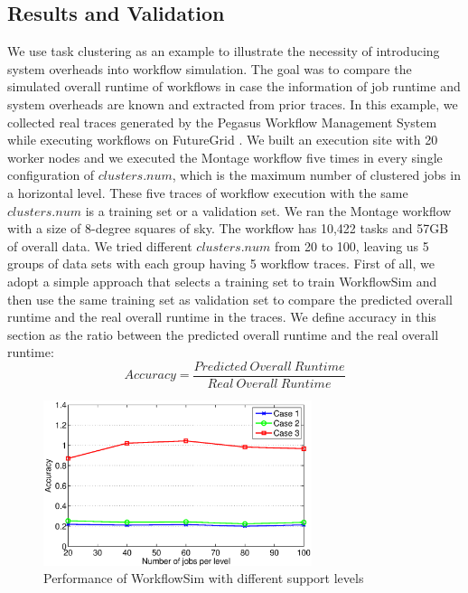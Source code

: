 \subsection{Results and Validation}
We use task clustering as an example to illustrate the necessity of introducing system overheads into workflow simulation. The goal was to compare the simulated overall runtime of workflows in case the information of job runtime and system overheads are known and extracted from prior traces. 
In this example, we collected real traces generated by the Pegasus Workflow Management System while executing workflows on FutureGrid \cite{Fox2013FutureGrid}. We built an execution site with 20 worker nodes and we executed the Montage workflow five times in every single configuration of $clusters.num$, which is the maximum number of clustered jobs in a horizontal level. These five traces of workflow execution with the same $clusters.num$ is a training set or a validation set. 
We ran the Montage workflow with a size of 8-degree squares of sky. The workflow has 10,422 tasks and 57GB of overall data. We tried different $clusters.num$ from 20 to 100, leaving us 5 groups of data sets with each group having 5 workflow traces. 
First of all, we adopt a simple approach that selects a training set to train WorkflowSim and then use the same training set as validation set to compare the predicted overall runtime and the real overall runtime in the traces. We define accuracy in this section as the ratio between the predicted overall runtime and the real overall runtime:
\begin{equation} \label{eq:model_wfs_accuracy}
Accuracy=\frac{Predicted~Overall~Runtime}{Real~Overall~Runtime}
\end{equation}
 \begin{figure}[h!]
	\centering
    \includegraphics[width=0.7\textwidth]{figures/model/wfs_levels.eps}
    \caption{Performance of WorkflowSim with different support levels}
    \label{fig:model_wfs_levels}
\end{figure} 
 
